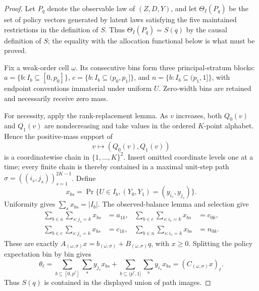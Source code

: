 \documentclass{article}
\begin{document}
\begin{proof}
Let \(P_q\) denote the observable law of \((Z,D,Y)\), and let \(\Theta_I(P_q)\) be the set of policy vectors generated by latent laws satisfying the five maintained restrictions in the definition of \(S\).  Thus \(\Theta_I(P_q)=S(q)\) by the causal definition of \(S\); the equality with the allocation functional below is what must be proved.

Fix a weak-order cell \(\omega\).  Its consecutive bins form three principal-stratum blocks: \(a=\{b:I_b\subseteq[0,p_0]\}\), \(c=\{b:I_b\subseteq(p_0,p_1]\}\), and \(n=\{b:I_b\subseteq(p_1,1]\}\), with endpoint conventions immaterial under uniform \(U\).  Zero-width bins are retained and necessarily receive zero mass.

For necessity, apply the rank-replacement lemma.  As \(v\) increases, both \(Q_0(v)\) and \(Q_1(v)\) are nondecreasing and take values in the ordered \(K\)-point alphabet.  Hence the positive-mass support of
\[
v\longmapsto (Q_0(v),Q_1(v))
\]
is a coordinatewise chain in \(\{1,\ldots,K\}^2\).  Insert omitted coordinate levels one at a time; every finite chain is thereby contained in a maximal unit-step path \(\sigma=((i_s,j_s))_{s=1}^{2K-1}\).  Define
\[
x_{bs}=\Pr\{U\in I_b,(Y_0,Y_1)=(y_{i_s},y_{j_s})\}.
\]
Uniformity gives \(\sum_sx_{bs}=|I_b|\).  The observed-balance lemma and selection give
\[
\begin{aligned}
\sum_{b\in a}\sum_{s:j_s=k}x_{bs}&=a_{1k},&
\sum_{b\in c}\sum_{s:i_s=k}x_{bs}&=c_{0k},\\
\sum_{b\in c}\sum_{s:j_s=k}x_{bs}&=c_{1k},&
\sum_{b\in n}\sum_{s:i_s=k}x_{bs}&=n_{0k}.
\end{aligned}
\]
These are exactly \(A_{(\omega,\sigma)}x=b_{(\omega,\sigma)}+B_{(\omega,\sigma)}q\), with \(x\ge0\).  Splitting the policy expectation bin by bin gives
\[
\theta_\ell
=\sum_{b\subseteq[0,p^\ell]}\sum_s y_{j_s}x_{bs}
 +\sum_{b\subseteq(p^\ell,1]}\sum_s y_{i_s}x_{bs}
=(C_{(\omega,\sigma)}x)_\ell.
\]
Thus \(S(q)\) is contained in the displayed union of path images.


\end{proof}
\end{document}
